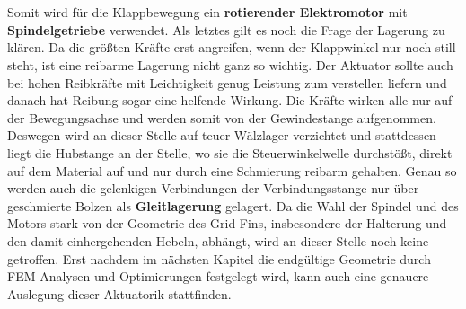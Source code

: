 \\~\\
Somit wird für die Klappbewegung ein \textbf{rotierender Elektromotor} mit \textbf{Spindelgetriebe} verwendet. Als letztes gilt es noch die Frage der Lagerung zu klären. Da die größten Kräfte erst angreifen, wenn der Klappwinkel nur noch still steht, ist eine reibarme Lagerung nicht ganz so wichtig. Der Aktuator sollte auch bei hohen Reibkräfte mit Leichtigkeit genug Leistung zum verstellen liefern und danach hat Reibung sogar eine helfende Wirkung. Die Kräfte wirken alle nur auf der Bewegungsachse und werden somit von der Gewindestange aufgenommen. Deswegen wird an dieser Stelle auf teuer Wälzlager verzichtet und stattdessen liegt die Hubstange an der Stelle, wo sie die Steuerwinkelwelle durchstößt, direkt auf dem Material auf und nur durch eine Schmierung reibarm gehalten. Genau so werden auch die gelenkigen Verbindungen der Verbindungsstange nur über geschmierte Bolzen als \textbf{Gleitlagerung} gelagert.
Da die Wahl der Spindel und des Motors stark von der Geometrie des Grid Fins, insbesondere der Halterung und den damit einhergehenden Hebeln, abhängt, wird an dieser Stelle noch keine getroffen. Erst nachdem im nächsten Kapitel die endgültige Geometrie durch FEM-Analysen und Optimierungen festgelegt wird, kann auch eine genauere Auslegung dieser Aktuatorik stattfinden.
